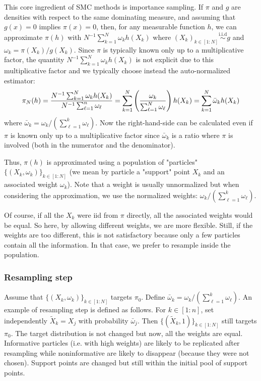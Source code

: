 \documentclass[english,graybox,envcountchap,envcountsame,sectrefs,shortlabels]{svmono}
\theoremstyle{style}
\newcommand{\iid}{\stackrel{\mathrm{i.i.d}}{\sim}}
\begin{document}
This core ingredient of SMC methods is importance sampling. If $\pi$ and $g$ are densities with respect to  the same dominating measure, and assuming that $g(x)=0$ implies $\pi(x)=0$, then, for any measurable function $h$, we can approximate $\pi(h)$ with $N^{-1}\sum_{k=1}^N \omega_k h(X_k)$ where $(X_k)_{k\in[1:N]} \iid g$ and $\omega_k=\pi(X_k)/g(X_k)$. Since $\pi$ is typically known only up to a multiplicative factor, the quantity $N^{-1}\sum_{k=1}^N \omega_k h(X_k)$ is not explicit due to this multiplicative factor and we typically choose instead the auto-normalized estimator:
$$
\pi_N(h) = \frac{N^{-1}\sum_{k=1}^N \omega_k h(X_k)}{N^{-1}\sum_{\ell=1}^n \omega_\ell}=\sum_{k=1}^N \left(\frac{ \omega_k}{\sum_{\ell=1}^N \omega_\ell}\right)  h(X_k)=\sum_{k=1}^N \bar\omega_k  h(X_k)
$$
where  $\bar \omega_k=\omega_k/(\sum_{\ell=1}^{k} \omega_\ell)$. Now the right-hand-side can be calculated even if $\pi$ is known only up to a multiplicative factor since $\bar \omega_k$ is a ratio where $\pi$ is involved (both in the numerator and the denominator).

Thus, $\pi(h)$ is approximated using a population of "particles" $\{(X_k,\omega_k)\}_{k\in[1:N]}$ (we mean by particle a "support" point $X_k$ and an associated weight $\omega_k$). Note that a weight is usually unnormalized but when considering the approximation, we use the normalized weights: $\omega_k/(\sum_{\ell=1}^{k} \omega_\ell)$.

Of course, if all the $X_k$ were iid from $\pi$ directly, all the associated weights would be equal. So here, by allowing different weights, we are more flexible. Still, if the weights are too different, this is not satisfactory because only a few particles contain all the information. In that case, we prefer to resample inside the population. 

\subsubsection{Resampling step}
Assume that $\{(X_k,\omega_k)\}_{k\in[1:N]}$ targets $\pi_0$. Define $\bar \omega_k=\omega_k/(\sum_{\ell=1}^{k} \omega_\ell)$. An example of resampling step is defined as follows. For $k\in[1:n]$, set independently $\tilde X_k = X_j$ with probability $\bar \omega_j$. 
Then $\{(\tilde X_k,1)\}_{k\in[1:N]}$ still targets $\pi_0$. The target distribution is not changed but now, all the weights are equal. Informative particles (i.e. with high weights) are likely to be replicated after resampling while noninformative are likely to disappear (because they were not chosen). Support points are changed but still within the initial pool of support points.
\end{document}
